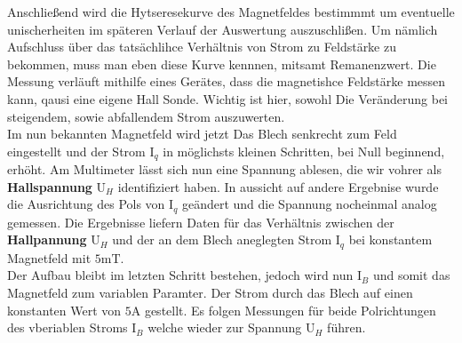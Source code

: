 Anschließend wird die Hytseresekurve %
des Magnetfeldes bestimmmt um eventuelle unischerheiten im späteren Verlauf der Auswertung auszuschlißen. Um nämlich Aufschluss über das 
tatsächlihce Verhältnis von Strom zu Feldstärke zu bekommen, muss man eben diese Kurve kennnen, mitsamt  Remanenzwert. %
Die Messung verläuft mithilfe eines Gerätes, dass die magnetishce Feldstärke messen kann, qausi eine eigene Hall Sonde.   
Wichtig ist hier, sowohl Die Veränderung bei steigendem, sowie abfallendem Strom auszuwerten.  \\

Im nun bekannten Magnetfeld wird jetzt Das Blech senkrecht zum Feld eingestellt und der Strom $\text{I}_q$ in möglichsts kleinen Schritten, bei Null beginnend, erhöht. 
Am Multimeter lässt sich nun eine Spannung ablesen, die wir vohrer als \textbf{Hallspannung} $\text{U}_H$  identifiziert haben. In aussicht auf andere Ergebnise 
wurde die Ausrichtung des Pols von $\text{I}_q$ geändert und die Spannung nocheinmal analog gemessen. Die Ergebnisse liefern Daten für das Verhältnis zwischen 
der \textbf{Hallpannung} $\text{U}_H$ und der an dem Blech aneglegten Strom $\text{I}_q$ bei konstantem Magnetfeld mit $5$m$\si{\tesla}$.\\

Der Aufbau bleibt im letzten Schritt bestehen, jedoch wird nun $\text{I}_B$ und somit das Magnetfeld zum variablen Paramter. Der Strom durch das Blech auf einen 
konstanten Wert von $5\si{\ampere}$ gestellt. Es folgen Messungen für beide Polrichtungen des vberiablen Stroms $\text{I}_B$ welche wieder zur Spannung $\text{U}_H$ führen.
                                                                                                                    
                                                                                                